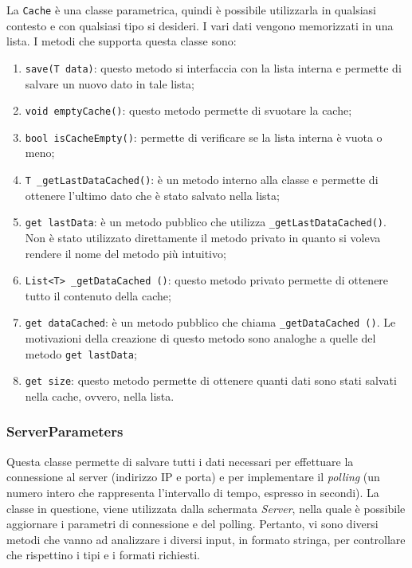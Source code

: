La \verb|Cache| è una classe parametrica, quindi è possibile utilizzarla in qualsiasi contesto e con qualsiasi tipo si desideri. I vari dati vengono memorizzati in una lista. I metodi che supporta questa classe sono:
\begin{enumerate}
	\item \verb|save(T data)|: questo metodo si interfaccia con la lista interna e permette di salvare un nuovo dato in tale lista;
	\item \verb|void emptyCache()|: questo metodo permette di svuotare la cache;
	\item \verb|bool isCacheEmpty()|: permette di verificare se la lista interna è vuota o meno;
	\item \verb|T _getLastDataCached()|: è un metodo interno alla classe e permette di ottenere l'ultimo dato che è stato salvato nella lista;
	\item \verb|get lastData|: è un metodo pubblico che utilizza \verb|_getLastDataCached()|. Non è stato utilizzato direttamente il metodo privato in quanto si voleva rendere il nome del metodo più intuitivo;
	\item \verb|List<T> _getDataCached ()|: questo metodo privato permette di ottenere tutto il contenuto della cache;
	\item \verb|get dataCached|: è un metodo pubblico che chiama \verb|_getDataCached ()|. Le motivazioni della creazione di questo metodo sono analoghe a quelle del metodo \verb|get lastData|;
	\item \verb|get size|: questo metodo permette di ottenere quanti dati sono stati salvati nella cache, ovvero, nella lista.
\end{enumerate}

\subsubsection{ServerParameters}
Questa classe permette di salvare tutti i dati necessari per effettuare la connessione al server (indirizzo IP e porta) e per implementare il \textit{polling} (un numero intero che rappresenta l'intervallo di tempo, espresso in secondi). La classe in questione, viene utilizzata dalla schermata \textit{Server}, nella quale è possibile aggiornare i parametri di connessione e del polling. Pertanto, vi sono diversi metodi che vanno ad analizzare i diversi input, in formato stringa, per controllare che rispettino i tipi e i formati richiesti.


